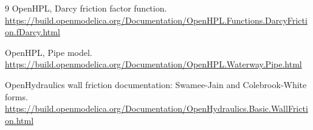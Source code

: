 \documentclass[11pt,a4paper]{article}
\begin{document}
\begin{thebibliography}{9}
OpenHPL, Darcy friction factor function.
\url{https://build.openmodelica.org/Documentation/OpenHPL.Functions.DarcyFriction.fDarcy.html}

OpenHPL, Pipe model.
\url{https://build.openmodelica.org/Documentation/OpenHPL.Waterway.Pipe.html}

OpenHydraulics wall friction documentation: Swamee-Jain and Colebrook-White forms.
\url{https://build.openmodelica.org/Documentation/OpenHydraulics.Basic.WallFriction.html}
\end{thebibliography}
\end{document}
